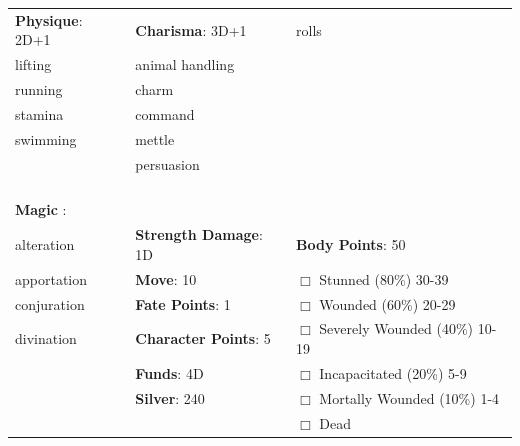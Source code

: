 \documentclass[10pt]{article}
\begin{document}
\begin{table}
\begin{tabular}{m{156pt} m{156pt} m{156pt}}
\textbf{Physique}: 2D+1 \hrulefill & \textbf{Charisma}: 3D+1 \hrulefill     & rolls \hrulefill \\

lifting              \hrulefill & animal handling      \hrulefill &  \hrulefill \\

running              \hrulefill & charm                \hrulefill &  \hrulefill \\

stamina              \hrulefill & command              \hrulefill &  \hrulefill \\

swimming             \hrulefill & mettle               \hrulefill &  \hrulefill \\

 \hrulefill & persuasion           \hrulefill &  \hrulefill \\

 \hrulefill &  \hrulefill &  \hrulefill \\

 \hrulefill &  \hrulefill &  \hrulefill \\

 \hrulefill &  \hrulefill &  \hrulefill \\

                                  &                                 &                             \\
\textbf{Magic }:  \hrulefill  &                                 &                             \\
alteration           \hrulefill & \textbf{Strength Damage}: 1D \hrulefill                             & \textbf{Body Points}: 50 \hrulefill \\
apportation          \hrulefill                        & \textbf{Move}:             10             \hrulefill    & $\Box$ Stunned \footnotesize{(80\%)} \hfill 30-39 \\
conjuration          \hrulefill                        & \textbf{Fate Points}:      1      \hrulefill    & $\Box$ Wounded \footnotesize{(60\%)} \hfill 20-29 \\
divination           \hrulefill                        & \textbf{Character Points}: 5 \hrulefill    & $\Box$ Severely Wounded \footnotesize{(40\%)} \hfill 10-19 \\
 \hrulefill                        & \textbf{Funds}:            4D            \hrulefill    & $\Box$ Incapacitated \footnotesize{(20\%)} \hfill 5-9 \\
 \hrulefill                        & \textbf{Silver}:           240           \hrulefill    & $\Box$ Mortally Wounded \footnotesize{(10\%)} \hfill 1-4 \\
 \hrulefill                        &  \hrulefill                                                       & $\Box$ Dead   \\
\end{tabular}
\end{table}
\end{document}
